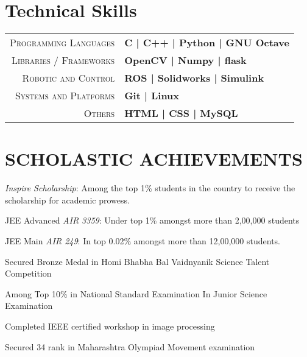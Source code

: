 \documentclass[]{deedy-resume-openfont}
\begin{document}
\begin{minipage}[t]{0.66\textwidth}

\section{Technical Skills}
\begin{tabular}{r|p{15cm}}
\textsc{Programming Languages} & \textbf{ C | C++ | Python | GNU Octave} \\
\textsc{Libraries / Frameworks} & \textbf{OpenCV | Numpy | flask }\\
\textsc{Robotic and Control} & \textbf{ROS | Solidworks | Simulink }\\
\textsc{Systems and Platforms} & \textbf{Git | Linux }\\
\textsc{Others} & \textbf{HTML | CSS | MySQL }\\
\end{tabular}

\section{SCHOLASTIC ACHIEVEMENTS}

\vspace{\topsep} %
\begin{tightemize}

\item {\emph{Inspire Scholarship}:} Among the top 1\% students in the country to receive the scholarship for academic prowess. \\
\item{JEE Advanced \emph{AIR 3359}:} Under top 1\% amongst more than 2,00,000 students \\
\item {JEE Main \emph{AIR 249}:} In top 0.02\% amongst more than 12,00,000 students. \\
\item {Secured Bronze Medal in Homi Bhabha Bal Vaidnyanik Science Talent Competition}\\
\item {Among Top 10\% in National Standard Examination In Junior Science Examination}\\
\item {Completed IEEE certified workshop in image processing  }\\
\item {Secured 34 rank in Maharashtra Olympiad Movement examination}\\
\end{tightemize}
\sectionsep


\end{minipage} 
\end{document}

